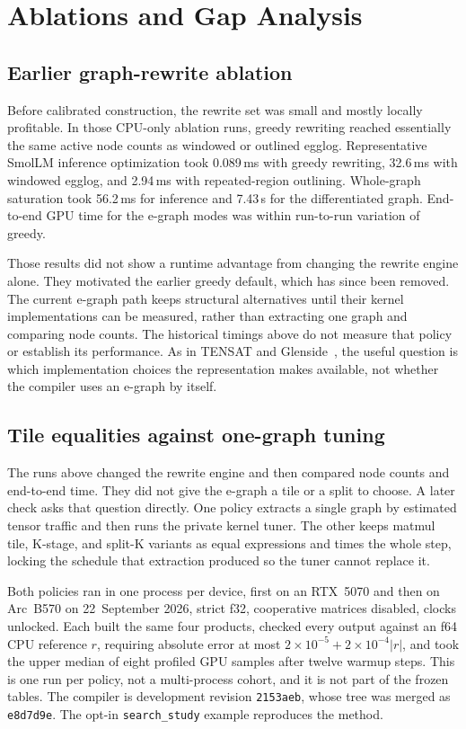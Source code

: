 \documentclass[10pt,twocolumn]{article}
\newcommand{\code}[1]{\texttt{#1}}
\begin{document}
\section{Ablations and Gap Analysis}
\label{sec:ablation}

\subsection{Earlier graph-rewrite ablation}

Before calibrated construction, the rewrite set was small and mostly
locally profitable. In those CPU-only ablation runs, greedy rewriting
reached essentially the same active node
counts as windowed or outlined egglog. Representative SmolLM inference
optimization took 0.089\,ms with greedy rewriting, 32.6\,ms with windowed
egglog, and 2.94\,ms with repeated-region outlining. Whole-graph saturation
took 56.2\,ms for inference and 7.43\,s for the differentiated graph.
End-to-end GPU time for the e-graph modes was within run-to-run variation of
greedy.

Those results did not show a runtime advantage from changing the rewrite
engine alone. They motivated the earlier greedy default, which has since
been removed. The current e-graph path keeps structural alternatives until
their kernel implementations can be measured, rather than extracting one
graph and comparing node counts. The historical timings above do not
measure that policy or establish its performance. As in TENSAT and
Glenside~\cite{yang2021tensat,smith2021glenside}, the useful question is which
implementation choices the representation makes available, not whether the
compiler uses an e-graph by itself.

\subsection{Tile equalities against one-graph tuning}

The runs above changed the rewrite engine and then compared node counts
and end-to-end time. They did not give the e-graph a tile or a split to
choose. A later check asks that question directly. One policy extracts a
single graph by estimated tensor traffic and then runs the private kernel
tuner. The other keeps matmul tile, K-stage, and split-K variants as
equal expressions and times the whole step, locking the schedule that
extraction produced so the tuner cannot replace it.

Both policies ran in one process per device, first on an RTX~5070 and then
on Arc~B570 on 22~September 2026, strict f32, cooperative matrices disabled,
clocks unlocked. Each built the same four products, checked every output
against an f64 CPU reference $r$, requiring absolute error at most
$2\times10^{-5}+2\times10^{-4}|r|$, and took the upper median
of eight profiled GPU samples after twelve warmup steps. This is one run per
policy, not a multi-process cohort, and it is not part of the frozen tables.
The compiler is development revision \code{2153aeb}, whose tree was merged
as \code{e8d7d9e}. The opt-in \code{search\_study} example reproduces the method.
\end{document}
